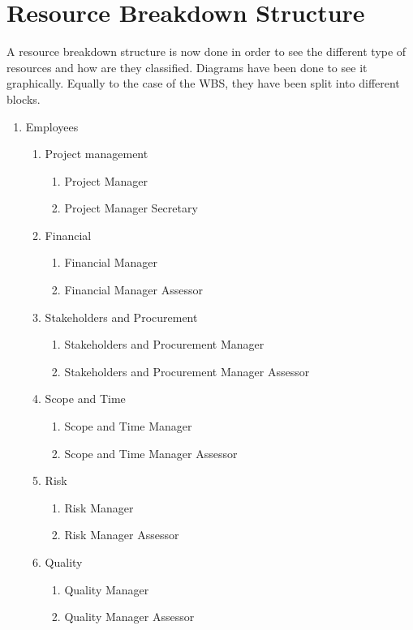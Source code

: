 \section{Resource Breakdown Structure}
A resource breakdown structure is now done in order to see the different type of resources and how are they classified. Diagrams have been done to see it graphically. Equally to the case of the WBS, they have been split into different blocks.
\begin{enumerate}[label*=\arabic*.]
	\item Employees
	\begin{enumerate}[label*=\arabic*.]
		\item Project management
		\begin{enumerate}[label*=\arabic*.]
			\item Project Manager
			\item Project Manager Secretary
		\end{enumerate}
		\item Financial
		\begin{enumerate}[label*=\arabic*.]
			\item Financial Manager
			\item Financial Manager Assessor
		\end{enumerate}
		\item Stakeholders and Procurement
		\begin{enumerate}[label*=\arabic*.]
			\item Stakeholders and Procurement Manager
			\item Stakeholders and Procurement Manager Assessor
		\end{enumerate}
		\item Scope and Time
		\begin{enumerate}[label*=\arabic*.]
			\item Scope and Time Manager
			\item Scope and Time Manager Assessor
		\end{enumerate}
		\item Risk
		\begin{enumerate}[label*=\arabic*.]
			\item Risk Manager
			\item Risk Manager Assessor
		\end{enumerate}
		\item Quality
		\begin{enumerate}[label*=\arabic*.]
			\item Quality Manager
			\item Quality Manager Assessor

\end{enumerate}
\end{enumerate}
\end{enumerate}
